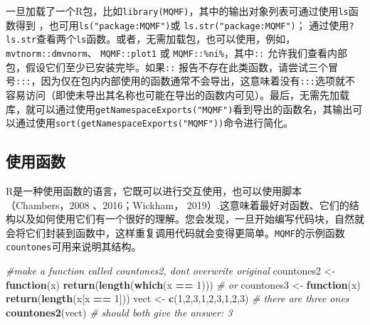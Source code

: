\documentclass[
  lang=cn,
  11pt,
  scheme=chinese,
  chinesefont=nofont,
  citestyle=gb7714-2015,
  bibstyle=gb7714-2015]{elegantbook}
\newenvironment{Shaded}{\begin{snugshade}}{\end{snugshade}}
\newcommand{\CommentTok}[1]{\textcolor[rgb]{0.56,0.35,0.01}{\textit{#1}}}
\newcommand{\ControlFlowTok}[1]{\textcolor[rgb]{0.13,0.29,0.53}{\textbf{#1}}}
\newcommand{\DecValTok}[1]{\textcolor[rgb]{0.00,0.00,0.81}{#1}}
\newcommand{\FunctionTok}[1]{\textcolor[rgb]{0.13,0.29,0.53}{\textbf{#1}}}
\newcommand{\NormalTok}[1]{#1}
\newcommand{\OtherTok}[1]{\textcolor[rgb]{0.56,0.35,0.01}{#1}}
\newcommand{\SpecialCharTok}[1]{\textcolor[rgb]{0.81,0.36,0.00}{\textbf{#1}}}
\begin{document}
一旦加载了一个R包，比如\texttt{library(MQMF)}，其中的输出对象列表可通过使用\texttt{ls}函数得到 ，也可用\texttt{ls("package:MQMF")}或 \texttt{ls.str("package:MQMF")}； 通过使用\texttt{?ls.str}查看两个\texttt{ls}函数。或者，无需加载包，也可以使用，例如，\texttt{mvtnorm::dmvnorm}、 \texttt{MQMF::plot1} 或 \texttt{MQMF::\textquotesingle{}\%ni\%\textquotesingle{}}，其中\texttt{::} 允许我们查看内部包，假设它们至少已安装完毕。如果\texttt{::} 报告不存在此类函数，请尝试三个冒号\texttt{:::}，因为仅在包内内部使用的函数通常不会导出，这意味着没有\texttt{:::}选项就不容易访问（即使未导出其名称也可能在导出的函数内可见）。最后，无需先加载库，就可以通过使用\texttt{getNamespaceExports("MQMF")}看到导出的函数名，其输出可以通过使用\texttt{sort(getNamespaceExports("MQMF"))}命令进行简化。

\subsection{使用函数}\label{ux4f7fux7528ux51fdux6570}

R是一种使用函数的语言，它既可以进行交互使用，也可以使用脚本（Chambers，2008 、2016；Wickham， 2019）.这意味着最好对函数、它们的结构以及如何使用它们有一个很好的理解。您会发现，一旦开始编写代码块，自然就会将它们封装到函数中，这样重复调用代码就会变得更简单。\texttt{MQMF}的示例函数\texttt{countones}可用来说明其结构。

\begin{Shaded}
\begin{Highlighting}[]
\CommentTok{\#make a function called countones2, don\textquotesingle{}t overwrite original  }
\NormalTok{countones2 }\OtherTok{\textless{}{-}} \ControlFlowTok{function}\NormalTok{(x) }\FunctionTok{return}\NormalTok{(}\FunctionTok{length}\NormalTok{(}\FunctionTok{which}\NormalTok{(x }\SpecialCharTok{==} \DecValTok{1}\NormalTok{)))  }\CommentTok{\# or  }
\NormalTok{countones3 }\OtherTok{\textless{}{-}} \ControlFlowTok{function}\NormalTok{(x) }\FunctionTok{return}\NormalTok{(}\FunctionTok{length}\NormalTok{(x[x }\SpecialCharTok{==} \DecValTok{1}\NormalTok{]))  }
\NormalTok{vect }\OtherTok{\textless{}{-}} \FunctionTok{c}\NormalTok{(}\DecValTok{1}\NormalTok{,}\DecValTok{2}\NormalTok{,}\DecValTok{3}\NormalTok{,}\DecValTok{1}\NormalTok{,}\DecValTok{2}\NormalTok{,}\DecValTok{3}\NormalTok{,}\DecValTok{1}\NormalTok{,}\DecValTok{2}\NormalTok{,}\DecValTok{3}\NormalTok{)  }\CommentTok{\# there are three ones  }
\FunctionTok{countones2}\NormalTok{(vect)  }\CommentTok{\# should both give the answer: 3  }
\end{Highlighting}
\end{Shaded}
\end{document}

